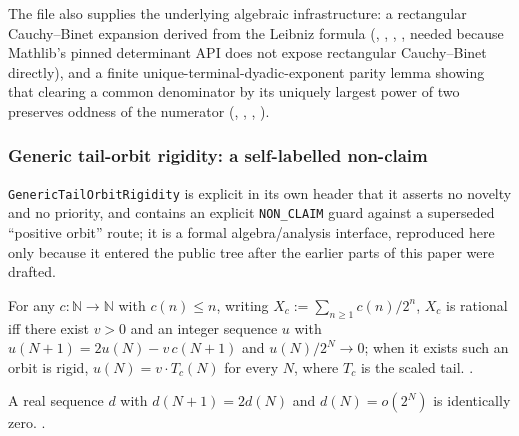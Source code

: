 The file also supplies the underlying algebraic infrastructure: a
rectangular Cauchy--Binet expansion derived from the Leibniz formula
(,
, , , needed because
Mathlib's pinned determinant API does not expose rectangular Cauchy--Binet
directly), and a finite unique-terminal-dyadic-exponent parity lemma showing
that clearing a common denominator by its uniquely largest power of two
preserves oddness of the numerator
(,
, , ).

\subsubsection{Generic tail-orbit rigidity: a self-labelled non-claim}

\texttt{GenericTailOrbitRigidity} is explicit in its own header that it
asserts no novelty and no priority, and contains an explicit \texttt{NON\_CLAIM}
guard against a superseded ``positive orbit'' route; it is a formal
algebra/analysis interface, reproduced here only because it entered the
public tree after the earlier parts of this paper were drafted.

\begin{thm}
For any $c:\mathbb{N}\to\mathbb{N}$ with $c(n)\le n$, writing
$X_c := \sum_{n\ge 1} c(n)/2^n$, $X_c$ is rational iff there exist $v>0$ and
an integer sequence $u$ with $u(N{+}1) = 2u(N) - v\,c(N{+}1)$ and
$u(N)/2^N \to 0$; when it exists such an orbit is rigid, $u(N) = v\cdot T_c(N)$
for every $N$, where $T_c$ is the scaled tail.
\quad {}
\quad {} \quad {} \quad {}.
\end{thm}

\begin{prop}
A real sequence $d$ with $d(N{+}1)=2d(N)$ and $d(N)=o(2^N)$ is identically
zero.
\quad {} \quad {} \quad {}.
\end{prop}


